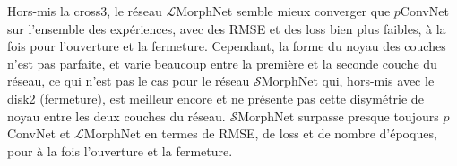 \vspace{-1.8mm}
\noindent Hors-mis la cross3, le réseau $\mathcal{L}$MorphNet semble mieux converger que $p$ConvNet sur l'ensemble des expériences, avec des RMSE et des loss bien plus faibles, à la fois pour l'ouverture et la fermeture. Cependant, la forme du noyau des couches n'est pas parfaite, et varie beaucoup entre la première et la seconde couche du réseau, ce qui n'est pas le cas pour le réseau $\mathcal{S}$MorphNet qui, hors-mis avec le disk2 (fermeture), est meilleur encore et ne présente pas cette disymétrie de noyau entre les deux couches du réseau. $\mathcal{S}$MorphNet surpasse presque toujours $p$ConvNet et $\mathcal{L}$MorphNet en termes de RMSE, de loss et de nombre d'époques, pour à la fois l'ouverture et la fermeture.



